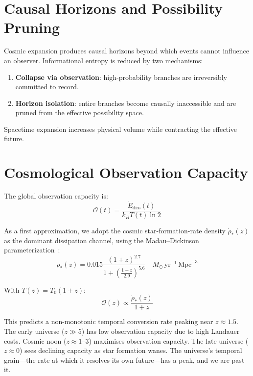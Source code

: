 \documentclass[12pt,a4paper]{article}
\begin{document}
\section{Causal Horizons and Possibility Pruning}
\label{sec:horizons}

Cosmic expansion produces causal horizons beyond which events cannot influence an observer. Informational entropy is reduced by two mechanisms:
\begin{enumerate}
    \item \textbf{Collapse via observation}: high-probability branches are irreversibly committed to record.
    \item \textbf{Horizon isolation}: entire branches become causally inaccessible and are pruned from the effective possibility space.
\end{enumerate}

Spacetime expansion increases physical volume while contracting the effective future.

\section{Cosmological Observation Capacity}
\label{sec:cosmology}

The global observation capacity is:
\begin{equation}
    \mathcal{O}(t) = \frac{\dot{E}_{\mathrm{diss}}(t)}{k_B T(t) \ln 2}
\end{equation}

As a first approximation, we adopt the cosmic star-formation-rate density $\dot{\rho}_*(z)$ as the dominant dissipation channel, using the Madau--Dickinson parameterization~\cite{Madau2014}:
\begin{equation}
    \dot{\rho}_*(z) = 0.015 \frac{(1+z)^{2.7}}{1 + \left(\frac{1+z}{2.9}\right)^{5.6}} \quad M_\odot \, \mathrm{yr}^{-1} \, \mathrm{Mpc}^{-3}
\end{equation}

With $T(z) = T_0(1+z)$:
\begin{equation}
    \mathcal{O}(z) \propto \frac{\dot{\rho}_*(z)}{1+z}
\end{equation}

This predicts a non-monotonic temporal conversion rate peaking near $z \approx 1.5$. The early universe ($z \gg 5$) has low observation capacity due to high Landauer costs. Cosmic noon ($z \approx 1$--$3$) maximises observation capacity. The late universe ($z \approx 0$) sees declining capacity as star formation wanes. The universe's temporal grain---the rate at which it resolves its own future---has a peak, and we are past it.
\end{document}
